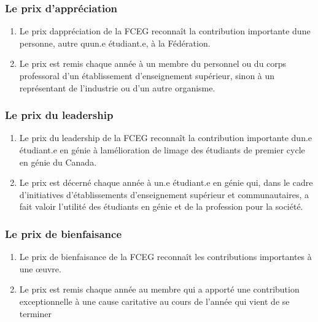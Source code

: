 \subsubsection{Le prix d'appréciation}
\label{le-prix-d-appreciation}

\begin{enumerate}
 \item
  Le prix d\textquotesingle appréciation de la FCEG reconnaît la contribution importante d\textquotesingle une personne, autre qu\textquotesingle un.e étudiant.e, à la Fédération.
 \item
  Le prix est remis chaque année à un membre du personnel ou du corps professoral d'un établissement d'enseignement supérieur, sinon à un représentant de l'industrie ou d'un autre organisme.
\end{enumerate}

\subsubsection{Le prix du leadership}
\label{le-prix-du-leadership}

\begin{enumerate}
 \item
  Le prix du leadership de la FCEG reconnaît la contribution importante d\textquotesingle un.e étudiant.e en génie à l\textquotesingle amélioration de l\textquotesingle image des étudiants de premier cycle en génie du Canada.
 \item
  Le prix est décerné chaque année à un.e étudiant.e en génie qui, dans le cadre d'initiatives d'établissements d'enseignement supérieur et communautaires, a fait valoir l'utilité des étudiants en génie et de la profession pour la société.
\end{enumerate}

\subsubsection{Le prix de bienfaisance}
\label{le-prix-de-bienfaisance}

\begin{enumerate}
 \item
  Le prix de bienfaisance de la FCEG reconnaît les contributions importantes à une œuvre.
 \item
  Le prix est remis chaque année au membre qui a apporté une contribution exceptionnelle à une cause caritative au cours de l'année qui vient de se terminer
\end{enumerate}

